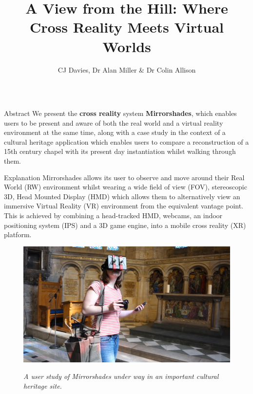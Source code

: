 \documentclass[final,t]{beamer}
\title{\Huge A View from the Hill: Where Cross Reality Meets Virtual Worlds}
\author[CJ Davies]{CJ Davies, Dr Alan Miller \& Dr Colin Allison}
\institute[University of St Andrews]{Open Virtual Worlds, School of Computer Science, University of St Andrews}
\begin{document}
\begin{frame}
  \begin{columns}[t]
  

    \begin{column}{.31\linewidth}

		\begin{block}{Abstract}
			We present the \textbf{cross reality} system \textbf{Mirrorshades}, which enables users to be present and aware of both the real world and a virtual reality environment at the same time, along with a case study in the context of a cultural heritage application which enables users to compare a reconstruction of a 15th century chapel with its present day instantiation whilst walking through them.
		\end{block}

		\begin{block}{Explanation}
			Mirrorshades allows its user to observe and move around their Real World (RW) environment whilst wearing a wide field of view (FOV), stereoscopic 3D, Head Mounted Display (HMD) which allows them to alternatively view an immersive Virtual Reality (VR) environment from the equivalent vantage point. This is achieved by combining a head-tracked HMD, webcams, an indoor positioning system (IPS) and a 3D game engine, into a mobile cross reality (XR) platform.
						
						
			\begin{figure}[h]
				\begin{center}
					\includegraphics[width=\linewidth]{images/experiment_picture_2.png}

					\textit{A user study of Mirrorshades under way in an important cultural heritage site.}
				\end{center}
			\end{figure}
					

\end{block}
\end{column}
\end{columns}
\end{frame}
\end{document}
